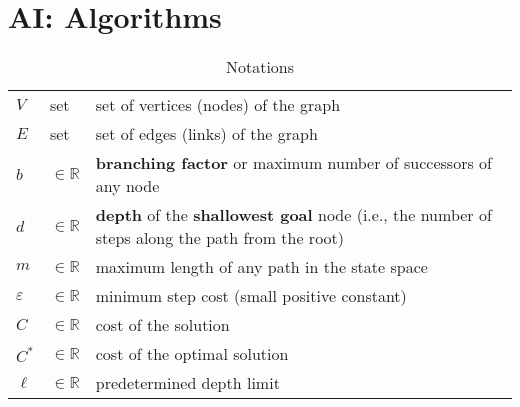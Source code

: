 \chapter{AI: Algorithms}\label{AI: Algorithms}

\begin{customArrayStretch}{1.3}
\begin{table}[H]
\centering
\begin{tabular}{l l p{14cm}}

$V$ & set & set of vertices (nodes) of the graph \\

$E$ & set  & set of edges (links) of the graph \\

$b$ & $\in \mathbb{R}$ & \textbf{branching factor} or maximum number of successors of any node \\

$d$ & $\in \mathbb{R}$ & \textbf{depth} of the \textbf{shallowest goal} node (i.e., the number of steps along the path from the root) \\

$m$ & $\in \mathbb{R}$ & maximum length of any path in the state space \\

$\varepsilon$ & $\in \mathbb{R}$ & minimum step cost (small positive constant) \\

$C$ & $\in \mathbb{R}$ & cost of the solution \\

$C^\ast$ & $\in \mathbb{R}$ & cost of the optimal solution \\

$\ell$ & $\in \mathbb{R}$ & predetermined depth limit \\

\end{tabular}
\caption*{Notations}
\end{table}
\end{customArrayStretch}















